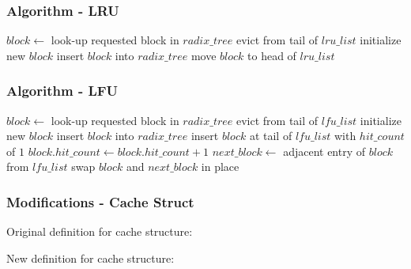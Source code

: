 \documentclass{beamer}
\begin{document}
\begin{frame}
  \frametitle{Algorithm - LRU}

  \begin{algorithmic}
    \State $block \gets$ look-up requested block in $radix\_tree$
        \State evict from tail of $lru\_list$
      \EndIf
      \State initialize new $block$
      \State insert $block$ into $radix\_tree$
    \EndIf
    \State move $block$ to head of $lru\_list$
  \end{algorithmic}

\end{frame}

\begin{frame}
  \frametitle{Algorithm - LFU}

  \begin{algorithmic}
    \State $block \gets$ look-up requested block in $radix\_tree$
        \State evict from tail of $lfu\_list$
      \EndIf
      \State initialize new $block$
      \State insert $block$ into $radix\_tree$
      \State insert $block$ at tail of $lfu\_list$ with $hit\_count$ of $1$
    \Else
      \State $block.hit\_count \gets block.hit\_count + 1$
      \State $next\_block \gets$ adjacent entry of $block$ from $lfu\_list$
        \State swap $block$ and $next\_block$ in place
      \EndIf
    \EndIf
  \end{algorithmic}

\end{frame}

\begin{frame}
  \frametitle{Modifications - Cache Struct}

  Original definition for cache structure:
  \begin{adjustbox}{width=\textwidth,keepaspectratio}
    
  \end{adjustbox}

  \vspace{\baselineskip}

  New definition for cache structure:
  \begin{adjustbox}{width=\textwidth,keepaspectratio}
    
  \end{adjustbox}

\end{frame}
\end{document}
